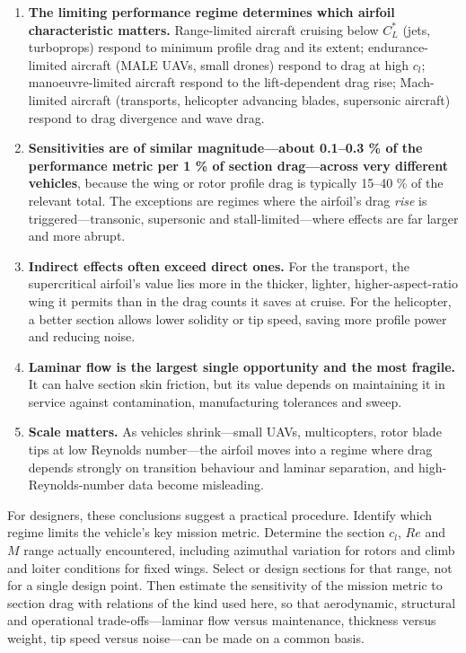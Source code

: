 \documentclass[10pt,a4paper,twocolumn]{article}
\begin{document}
\begin{enumerate}
\def\labelenumi{\arabic{enumi}.}
\item
  \textbf{The limiting performance regime determines which airfoil
  characteristic matters.} Range-limited aircraft cruising below
  \(C_L^*\) (jets, turboprops) respond to minimum profile drag and its
  extent; endurance-limited aircraft (MALE UAVs, small drones) respond
  to drag at high \(c_l\); manoeuvre-limited aircraft respond to the
  lift-dependent drag rise; Mach-limited aircraft (transports,
  helicopter advancing blades, supersonic aircraft) respond to drag
  divergence and wave drag.
\item
  \textbf{Sensitivities are of similar magnitude---about 0.1--0.3 \% of
  the performance metric per 1 \% of section drag---across very
  different vehicles}, because the wing or rotor profile drag is
  typically 15--40 \% of the relevant total. The exceptions are regimes
  where the airfoil's drag \emph{rise} is triggered---transonic,
  supersonic and stall-limited---where effects are far larger and more
  abrupt.
\item
  \textbf{Indirect effects often exceed direct ones.} For the transport,
  the supercritical airfoil's value lies more in the thicker, lighter,
  higher-aspect-ratio wing it permits than in the drag counts it saves
  at cruise. For the helicopter, a better section allows lower solidity
  or tip speed, saving more profile power and reducing noise.
\item
  \textbf{Laminar flow is the largest single opportunity and the most
  fragile.} It can halve section skin friction, but its value depends on
  maintaining it in service against contamination, manufacturing
  tolerances and sweep.
\item
  \textbf{Scale matters.} As vehicles shrink---small UAVs, multicopters,
  rotor blade tips at low Reynolds number---the airfoil moves into a
  regime where drag depends strongly on transition behaviour and laminar
  separation, and high-Reynolds-number data become misleading.
\end{enumerate}

For designers, these conclusions suggest a practical procedure. Identify
which regime limits the vehicle's key mission metric. Determine the
section \(c_l\), \(Re\) and \(M\) range actually encountered, including
azimuthal variation for rotors and climb and loiter conditions for fixed
wings. Select or design sections for that range, not for a single design
point. Then estimate the sensitivity of the mission metric to section
drag with relations of the kind used here, so that aerodynamic,
structural and operational trade-offs---laminar flow versus maintenance,
thickness versus weight, tip speed versus noise---can be made on a
common basis.
\end{document}

